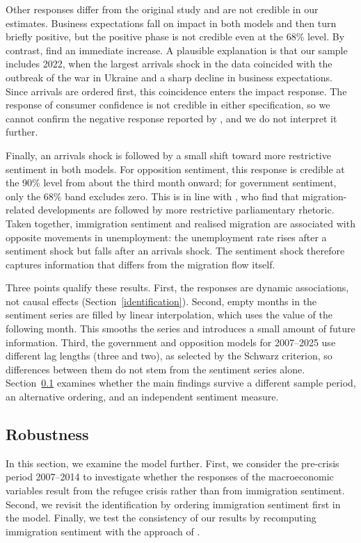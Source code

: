 \documentclass[12pt]{scrartcl}
\numberwithin{equation}{section}				%
\begin{document}
    Other responses differ from the original study and are not credible in our estimates. Business expectations fall on impact in both models and then turn briefly positive, but the positive phase is not credible even at the 68\% level. By contrast, \textcite{maffei2021does} find an immediate increase. A plausible explanation is that our sample includes 2022, when the largest arrivals shock in the data coincided with the outbreak of the war in Ukraine and a sharp decline in business expectations. Since arrivals are ordered first, this coincidence enters the impact response. The response of consumer confidence is not credible in either specification, so we cannot confirm the negative response reported by \textcite{maffei2021does}, and we do not interpret it further.
    
    Finally, an arrivals shock is followed by a small shift toward more restrictive sentiment in both models. For opposition sentiment, this response is credible at the 90\% level from about the third month onward; for government sentiment, only the 68\% band excludes zero. This is in line with \textcite{abdelatif2026uncertainty}, who find that migration-related developments are followed by more restrictive parliamentary rhetoric. Taken together, immigration sentiment and realised migration are associated with opposite movements in unemployment: the unemployment rate rises after a sentiment shock but falls after an arrivals shock. The sentiment shock therefore captures information that differs from the migration flow itself.
    
    Three points qualify these results. First, the responses are dynamic associations, not causal effects (Section~\ref{identification}). Second, empty months in the sentiment series are filled by linear interpolation, which uses the value of the following month. This smooths the series and introduces a small amount of future information. Third, the government and opposition models for 2007--2025 use different lag lengths (three and two), as selected by the Schwarz criterion, so differences between them do not stem from the sentiment series alone. Section~\ref{sec:robustness} examines whether the main findings survive a different sample period, an alternative ordering, and an independent sentiment measure.
    
    \clearpage
    
    \subsection{Robustness}
    \label{sec:robustness}
     In this section, we examine the model further. First, we consider the pre-crisis period 2007--2014 to investigate whether the responses of the macroeconomic variables result from the refugee crisis rather than from immigration sentiment. Second, we revisit the identification by ordering immigration sentiment first in the model. Finally, we test the consistency of our results by recomputing immigration sentiment with the approach of \textcite{kostikova2024fine}.
     
\end{document}
